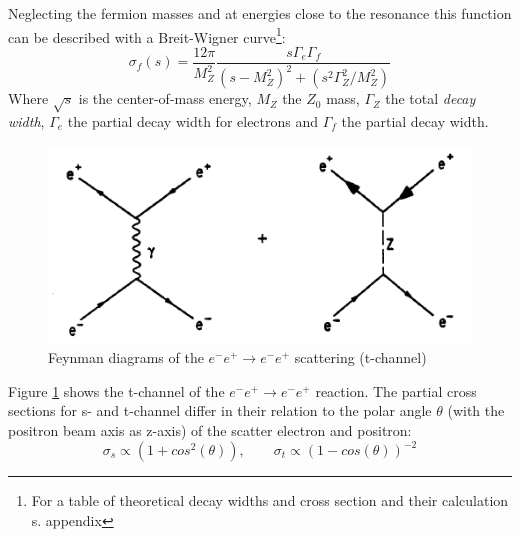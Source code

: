  Neglecting the fermion masses and at energies close to the resonance this function can be described with a Breit-Wigner curve\footnote{For a table of theoretical decay widths and cross section and their calculation s. appendix}\cite{staatsex}:
\begin{equation}
\sigma_f(s) = \frac{12\pi}{M_Z^2} \frac{s\Gamma_e\Gamma_f}{(s-M_Z^2)^2+(s^2\Gamma_Z^2/M_Z^2)}
\label{eq:principles:breitwigner}
\end{equation}
Where $\sqrt{s}$ is the center-of-mass energy, $M_Z$ the $Z_0$ mass, $\Gamma_Z$ the total \emph{decay width}, $\Gamma_e$ the partial decay width for electrons and $\Gamma_f$ the partial decay width.
\begin{figure}[H]
	\centering
	\includegraphics{graphics/BhabbaStreuung.png}
	\caption{Feynman diagrams of the $e^-e^+ \rightarrow e^-e^+$ scattering (t-channel)}
	\label{fig:principles:BhabbaStreuung.png}
\end{figure}
Figure \ref{fig:principles:BhabbaStreuung.png} shows the t-channel of the  $e^-e^+ \rightarrow e^-e^+$ reaction. The partial cross sections for s- and t-channel differ in their relation to the polar angle $\theta$ (with the positron beam axis as z-axis) of the scatter electron and positron\cite{anleitung}:
\begin{equation}
\sigma_s \propto (1+cos^2(\theta)),\qquad\sigma_t \propto (1-cos(\theta))^{-2}
\label{eq:principles:s-t-channel}
\end{equation}

